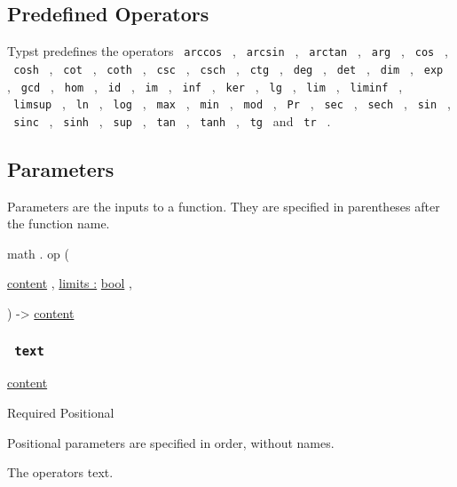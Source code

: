\subsection{Predefined Operators}\label{predefined}

Typst predefines the operators \texttt{\ arccos\ } , \texttt{\ arcsin\ }
, \texttt{\ arctan\ } , \texttt{\ arg\ } , \texttt{\ cos\ } ,
\texttt{\ cosh\ } , \texttt{\ cot\ } , \texttt{\ coth\ } ,
\texttt{\ csc\ } , \texttt{\ csch\ } , \texttt{\ ctg\ } ,
\texttt{\ deg\ } , \texttt{\ det\ } , \texttt{\ dim\ } ,
\texttt{\ exp\ } , \texttt{\ gcd\ } , \texttt{\ hom\ } , \texttt{\ id\ }
, \texttt{\ im\ } , \texttt{\ inf\ } , \texttt{\ ker\ } ,
\texttt{\ lg\ } , \texttt{\ lim\ } , \texttt{\ liminf\ } ,
\texttt{\ limsup\ } , \texttt{\ ln\ } , \texttt{\ log\ } ,
\texttt{\ max\ } , \texttt{\ min\ } , \texttt{\ mod\ } , \texttt{\ Pr\ }
, \texttt{\ sec\ } , \texttt{\ sech\ } , \texttt{\ sin\ } ,
\texttt{\ sinc\ } , \texttt{\ sinh\ } , \texttt{\ sup\ } ,
\texttt{\ tan\ } , \texttt{\ tanh\ } , \texttt{\ tg\ } and
\texttt{\ tr\ } .

\subsection{\texorpdfstring{{ Parameters
}}{ Parameters }}\label{parameters}

\label{parameters-tooltip}
Parameters are the inputs to a function. They are specified in
parentheses after the function name.

math { . } { op } (

{ \href{/docs/reference/foundations/content/}{content} , } {
\hyperref[parameters-limits]{limits :}
\href{/docs/reference/foundations/bool/}{bool} , }

) -\textgreater{} \href{/docs/reference/foundations/content/}{content}

\subsubsection{\texorpdfstring{\texttt{\ text\ }}{ text }}\label{parameters-text}

\href{/docs/reference/foundations/content/}{content}

{Required} {{ Positional }}

\label{parameters-text-positional-tooltip}
Positional parameters are specified in order, without names.

The operator\textquotesingle s text.


